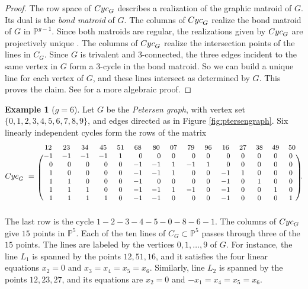 \documentclass[12pt]{extarticle}
\theoremstyle{definition}
\newtheorem{example}[theorem]{Example}
\numberwithin{theorem}{section}
\theoremstyle{plain}\newtheorem{ithm}{Theorem}
\newcommand{\PP}{\mathbb{P}}
\begin{document}
\begin{proof}
  The row space of ${\rm Cyc}_G$ describes a realization of the graphic matroid of $G$. 
    Its dual is the {\em bond matroid} of $G$.
  The columns of
  ${\rm Cyc}_G$ realize the bond matroid of $G$ in $\PP^{g-1}$.  Since both matroids are regular, 
  the realizations given by ${\rm Cyc}_G$ are projectively unique \cite{BL76}. %
  The columns of ${\rm Cyc}_G$ realize the intersection points of the lines in $C_G$. Since
   $G$ is trivalent and $3$-connected, the three edges incident to the same vertex in $G$ form a $3$-cycle in the bond matroid.  So we can build a unique line for each vertex of $G$, and these lines intersect as determined by $G$.
  This proves the claim.  
  See \cite[Theorem 8.1]{BE} for a more algebraic proof.
\end{proof}


\begin{example}[$g=6$] \label{ex:petersenpart1} Let $G$ be the
  {\em Petersen graph}, with vertex set $\{0,1,2,3,4,5,6,7,8,9\}$,
  and edges directed as in Figure \ref{fig:ptersengraph}. 
  Six linearly independent  cycles form the rows of the matrix
  \setcounter{MaxMatrixCols}{20}
  $$ {\rm Cyc}_G \,\, = \,\, \begin{small} \begin{blockarray}{ccccccccccccccc} 12&23&34&45&51&68&80&07&79&96&16&27&38&49&50 \\
      \begin{block}{(ccccccccccccccc)}
        -1& -1& -1& -1& 1& \phantom{-}0& \phantom{-}0& 0& \phantom{-}0& 0& \phantom{-}0& 0& 0& 0& 0 \,\, \\
        \phantom{-} 0& \phantom{-}0& \phantom{-}0& \phantom{-}0& 0& -1& -1& 1& -1& 1& \phantom{-}0& 0& 0& 0 &0\,\,\\
        \phantom{-} 1& \phantom{-}0& \phantom{-}0& \phantom{-}0& 0& -1& -1& 1& \phantom{-}0& 0& -1& 1& 0& 0& 0 \,\,\\
        \phantom{-} 1& \phantom{-}1& \phantom{-}0& \phantom{-}0& 0& -1& \phantom{-}0& 0& \phantom{-}0& 0& -1& 0& 1& 0& 0 \,\,\\
        \phantom{-} 1& \phantom{-}1& \phantom{-}1& \phantom{-}0& 0& -1& -1& 1& -1& 0& -1& 0& 0& 1& 0 \,\,\\
        \phantom{-} 1& \phantom{-}1& \phantom{-}1& \phantom{-}1& 0& -1& -1& 0& \phantom{-}0& 0& -1& 0& 0& 0& 1 \,\,\\
      \end{block}
    \end{blockarray} \end{small}. \vspace{-0.3cm}
  $$
  The last row is the cycle $1{-}2{-}3{-}4{-}5{-}0{-}8{-}6{-}1$.
  The columns of ${\rm Cyc}_G$ give $15$ points in $\PP^5$. Each of the ten lines
  of $C_G\subset \PP^5$ passes through three of the $15$ points. The lines
  are labeled by the vertices $0,1,\ldots,9$ of $G$.
  For instance,
  the line  $L_1$ is spanned by the points $12,51,16$,
  and it satisfies the four linear equations
  $x_2 = 0$ and $x_3 = x_4 = x_5 = x_6$.
  Similarly, line $L_2$ is spanned by the points $12,23,27$,
  and its equations are $x_2=0$ and $-x_1 = x_4 = x_5 = x_6$.
\end{example} 
\end{document}
